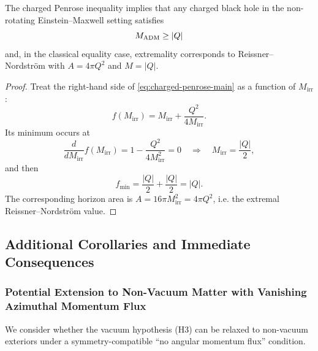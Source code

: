 \begin{corollary}\label{cor:extremal-bound}
The charged Penrose inequality implies that any charged black hole in the non-rotating Einstein--Maxwell setting satisfies
\begin{equation}
    M_{\mathrm{ADM}} \geq |Q|
\end{equation}
and, in the classical equality case, extremality corresponds to Reissner--Nordstr\"om with $A = 4\pi Q^2$ and $M = |Q|$.
\end{corollary}

\begin{proof}
Treat the right-hand side of \eqref{eq:charged-penrose-main} as a function of $M_{\mathrm{irr}}$:
\[
f(M_{\mathrm{irr}})=M_{\mathrm{irr}}+\frac{Q^2}{4M_{\mathrm{irr}}}.
\]
Its minimum occurs at
\[
\frac{d}{dM_{\mathrm{irr}}}f(M_{\mathrm{irr}})=1-\frac{Q^2}{4M_{\mathrm{irr}}^2}=0
\quad\Rightarrow\quad
M_{\mathrm{irr}}=\frac{|Q|}{2},
\]
and then
\[
f_{\min}=\frac{|Q|}{2}+\frac{|Q|}{2}=|Q|.
\]
The corresponding horizon area is $A=16\pi M_{\mathrm{irr}}^2=4\pi Q^2$, i.e. the extremal Reissner--Nordstr\"om value.
\end{proof}

\subsection{Additional Corollaries and Immediate Consequences}\label{subsec:corollaries}

\subsubsection{Potential Extension to Non-Vacuum Matter with Vanishing Azimuthal Momentum Flux}

We consider whether the vacuum hypothesis (H3) can be relaxed to non-vacuum exteriors under a symmetry-compatible ``no angular momentum flux'' condition.

